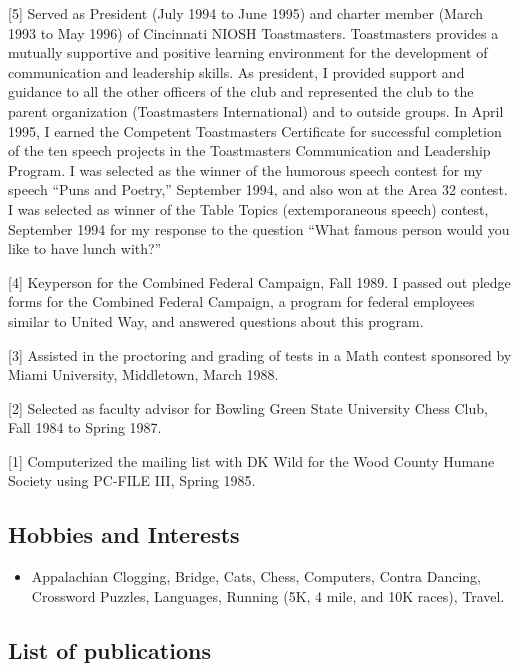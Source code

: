 \documentclass[
  12pt,
]{article}
\providecommand{\tightlist}{%
  \setlength{\itemsep}{0pt}\setlength{\parskip}{0pt}}
\begin{document}
{[}5{]} Served as President (July 1994 to June 1995) and charter member
(March 1993 to May 1996) of Cincinnati NIOSH Toastmasters. Toastmasters
provides a mutually supportive and positive learning environment for the
development of communication and leadership skills. As president, I
provided support and guidance to all the other officers of the club and
represented the club to the parent organization (Toastmasters
International) and to outside groups. In April 1995, I earned the
Competent Toastmasters Certificate for successful completion of the ten
speech projects in the Toastmasters Communication and Leadership
Program. I was selected as the winner of the humorous speech contest for
my speech ``Puns and Poetry,'' September 1994, and also won at the Area
32 contest. I was selected as winner of the Table Topics (extemporaneous
speech) contest, September 1994 for my response to the question ``What
famous person would you like to have lunch with?''

{[}4{]} Keyperson for the Combined Federal Campaign, Fall 1989. I passed
out pledge forms for the Combined Federal Campaign, a program for
federal employees similar to United Way, and answered questions about
this program.

{[}3{]} Assisted in the proctoring and grading of tests in a Math
contest sponsored by Miami University, Middletown, March 1988.

{[}2{]} Selected as faculty advisor for Bowling Green State University
Chess Club, Fall 1984 to Spring 1987.

{[}1{]} Computerized the mailing list with DK Wild for the Wood County
Humane Society using PC-FILE III, Spring 1985.

\subsection{Hobbies and Interests}\label{hobbies-and-interests}

\begin{itemize}
\tightlist
\item
  Appalachian Clogging, Bridge, Cats, Chess, Computers, Contra Dancing,
  Crossword Puzzles, Languages, Running (5K, 4 mile, and 10K races),
  Travel.
\end{itemize}

\subsection{List of publications}\label{list-of-publications}
\end{document}
